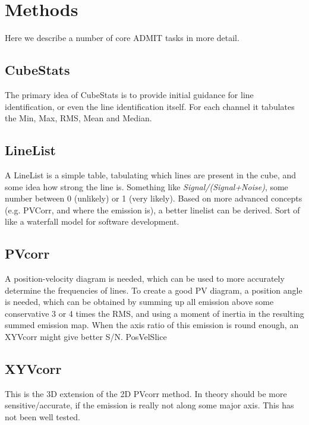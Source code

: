 \documentclass{article}
\begin{document}
\section{Methods}

Here we describe a number of core ADMIT tasks in more detail.

\subsection{CubeStats}

The primary idea of CubeStats is to provide initial guidance for line
identification, or even the line identification itself. For each
channel it tabulates the Min, Max, RMS, Mean and Median.

\subsection{LineList}

A LineList is a simple table, tabulating which lines are present
in the cube, and some idea how strong the line is. Something like
{\it Signal/(Signal+Noise)}, some number between 0 (unlikely) or 1 
(very likely). Based on more advanced concepts (e.g. PVCorr, 
and where the emission is), a better linelist can be derived. Sort
of like a waterfall model for software development.



\subsection{PVcorr}

A position-velocity diagram is needed, which can be used to more
accurately determine the frequencies of lines.  To create a good
PV diagram, a position angle is needed, which can be obtained
by summing up all emission above some conservative 3 or 4 times
the RMS, and using a moment of inertia in the resulting summed
emission map.  When the axis ratio of this emission is round
enough, an XYVcorr might give better S/N.  PosVelSlice

\subsection{XYVcorr}

This is the 3D extension of the 2D PVcorr method. In theory should be
more sensitive/accurate, if the emission is really not along some
major axis. This has not been well tested.
\end{document}
